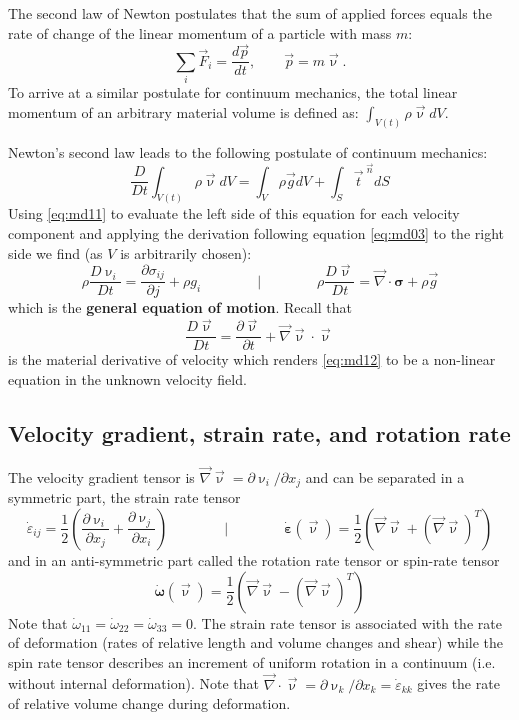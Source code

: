 The second law of Newton postulates that the sum of applied forces equals the rate of
change of the linear momentum of a particle with mass $m$:
\[
\sum_i \vec{F}_i = \frac{d\vec{p}}{dt},
\qquad
\vec{p}=m \vec{\upnu}.
\]
To arrive at a similar postulate for continuum mechanics, the total linear momentum of
an arbitrary material volume is defined as: $\int_{V(t)}\rho \vec{\upnu} dV$.

Newton’s second law leads to the following postulate of continuum mechanics:
\[
\frac{D}{Dt} \int_{V(t)} \rho \vec\upnu dV
=
\int_{V} \rho \vec{g} dV + \int_S \vec{t}^{\; \vec{n}} dS
\]
Using \eqref{eq:md11} to evaluate the left side of this equation 
for each velocity component and
applying the derivation following equation 
\eqref{eq:md03}
to the 
right side we find (as $V$ is arbitrarily chosen):
\begin{equation}
\rho\frac{D \upnu_i}{Dt} = \frac{\partial \sigma_{ij}}{\partial j} + \rho {g}_i
\qquad
\qquad
\bigg\rvert
\qquad
\qquad
\rho \frac{D\vec\upnu}{Dt} = \vec\nabla\cdot {\bm \sigma} + \rho \vec{g}
\label{eq:md12}
\end{equation}
which is the {\bf general equation of motion}.
Recall that
\[
\frac{D\vec\upnu}{Dt} = \frac{\partial \vec\upnu}{\partial t}
+
\vec\nabla \vec\upnu \cdot \vec\upnu
\]
is the material derivative of velocity which renders \eqref{eq:md12} to
be a non-linear equation in the unknown velocity field.

\subsection{Velocity gradient, strain rate, and rotation rate}
The velocity gradient tensor is $\vec\nabla\vec\upnu = \partial \upnu_i/\partial x_j$
and can be separated in a symmetric part, the strain rate tensor 
\[
\dot\varepsilon_{ij}=\frac12 \left(
\frac{\partial \upnu_i}{\partial x_j}
+ \frac{\partial \upnu_j}{\partial x_i}
\right)
\qquad
\qquad
\bigg\rvert
\qquad
\qquad
\dot{\bm \varepsilon}(\vec\upnu) = \frac12 \left(  
\vec\nabla\vec\upnu + (\vec\nabla\vec\upnu)^T \right)
\]
and in an anti-symmetric part called the rotation
rate tensor or spin-rate tensor
\[
\dot{\bm\omega} (\vec\upnu)=  \frac12 \left(  
\vec\nabla\vec\upnu - (\vec\nabla\vec\upnu)^T \right) 
\]
Note that $\dot\omega_{11}=\dot\omega_{22}=\dot\omega_{33}=0$.
The strain rate tensor is associated with the rate of
deformation (rates of relative length and volume changes and shear) 
while the spin rate
tensor describes an increment of uniform rotation in a continuum 
(i.e. without internal deformation). 
Note that  $\vec\nabla\cdot\vec\upnu= \partial \upnu_k/\partial x_k = 
\dot\varepsilon_{kk}$ gives the rate of relative volume change
during deformation.


